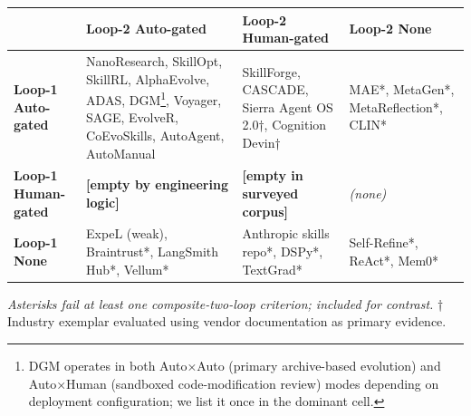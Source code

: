 \documentclass[
]{article}
\newcounter{none} %
\begin{document}
{\def\LTcaptype{none} %
\begin{longtable}[]{@{}
  >{\raggedright\arraybackslash}p{}
  >{\raggedright\arraybackslash}p{}
  >{\raggedright\arraybackslash}p{}
  >{\raggedright\arraybackslash}p{}@{}}
\toprule\noalign{}
\begin{minipage}[b]{\linewidth}\raggedright
\end{minipage} & \begin{minipage}[b]{\linewidth}\raggedright
\textbf{Loop-2 Auto-gated}
\end{minipage} & \begin{minipage}[b]{\linewidth}\raggedright
\textbf{Loop-2 Human-gated}
\end{minipage} & \begin{minipage}[b]{\linewidth}\raggedright
\textbf{Loop-2 None}
\end{minipage} \\
\midrule\noalign{}
\endhead
\bottomrule\noalign{}
\endlastfoot
\textbf{Loop-1 Auto-gated} & NanoResearch, SkillOpt, SkillRL,
AlphaEvolve, ADAS, DGM\footnote{DGM operates in both Auto×Auto (primary
  archive-based evolution) and Auto×Human (sandboxed code-modification
  review) modes depending on deployment configuration; we list it once
  in the dominant cell.}, Voyager, SAGE, EvolveR, CoEvoSkills,
AutoAgent, AutoManual & SkillForge, CASCADE, Sierra Agent OS 2.0†,
Cognition Devin† & MAE*, MetaGen*, MetaReflection*, CLIN* \\
\textbf{Loop-1 Human-gated} & \textbf{{[}empty by engineering logic{]}}
& \textbf{{[}empty in surveyed corpus{]}} & \emph{(none)} \\
\textbf{Loop-1 None} & ExpeL (weak), Braintrust*, LangSmith Hub*,
Vellum* & Anthropic skills repo*, DSPy*, TextGrad* & Self-Refine*,
ReAct*, Mem0* \\
\end{longtable}
}

\emph{Asterisks fail at least one composite-two-loop criterion; included
for contrast.} † Industry exemplar evaluated using vendor documentation
as primary evidence.
\end{document}
